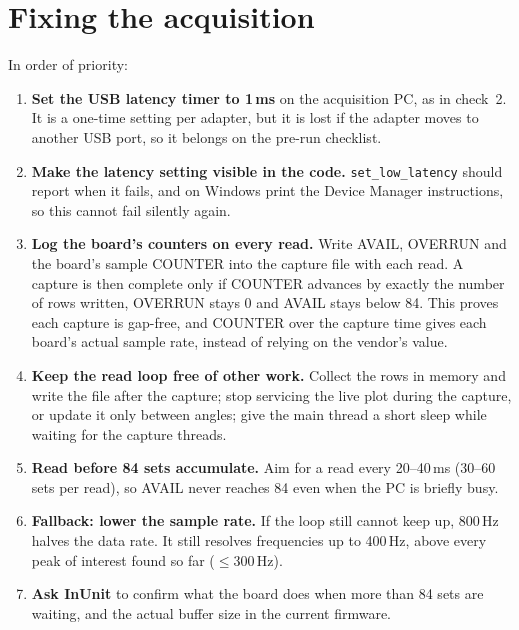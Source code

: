 \documentclass[11pt]{article}
\newcommand{\code}[1]{\texttt{#1}}
\begin{document}
\section{Fixing the acquisition}
\label{sec:fix}

In order of priority:

\begin{enumerate}
  \item \textbf{Set the USB latency timer to 1\,ms} on the acquisition PC,
        as in check~2. It is a one-time setting per adapter, but it is lost
        if the adapter moves to another USB port, so it belongs on the
        pre-run checklist.
  \item \textbf{Make the latency setting visible in the code.}
        \code{set\_low\_latency} should report when it fails, and on Windows
        print the Device Manager instructions, so this cannot fail silently
        again.
  \item \textbf{Log the board's counters on every read.} Write AVAIL,
        OVERRUN and the board's sample COUNTER into the capture file with
        each read. A capture is then complete only if COUNTER advances by
        exactly the number of rows written, OVERRUN stays 0 and AVAIL stays
        below 84. This proves each capture is gap-free, and COUNTER over the
        capture time gives each board's actual sample rate, instead of
        relying on the vendor's value.
  \item \textbf{Keep the read loop free of other work.} Collect the rows in
        memory and write the file after the capture; stop servicing the live
        plot during the capture, or update it only between angles; give the
        main thread a short sleep while waiting for the capture threads.
  \item \textbf{Read before 84 sets accumulate.} Aim for a read every
        20--40\,ms (30--60 sets per read), so AVAIL never reaches 84 even
        when the PC is briefly busy.
  \item \textbf{Fallback: lower the sample rate.} If the loop still cannot
        keep up, 800\,Hz halves the data rate. It still resolves frequencies
        up to 400\,Hz, above every peak of interest found so far
        ($\leq$300\,Hz).
  \item \textbf{Ask InUnit} to confirm what the board does when more than 84
        sets are waiting, and the actual buffer size in the current firmware.
\end{enumerate}
\end{document}
